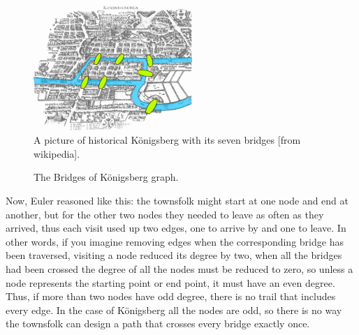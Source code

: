 \documentclass[11pt,a4paper]{scrartcl}
\begin{document}
  

\begin{figure}
\begin{center}
\includegraphics[width=6cm]{Konigsberg_bridges.png}
\end{center}
\caption{A picture of historical K\"{o}nigsberg with its seven bridges [from wikipedia].\label{fig:konigsberg}}
\end{figure}



\begin{figure}
\begin{center}
\end{center}
\caption{The Bridges of K\"{o}nigsberg graph. \label{fig:konigsberg_graph}}
\end{figure}

Now, Euler reasoned like this: the townsfolk might start at one node
and end at another, but for the other two nodes they needed to leave
as often as they arrived, thus each visit used up two edges, one to
arrive by and one to leave. In other words, if you imagine removing
edges when the corresponding bridge has been traversed, visiting a
node reduced its degree by two, when all the bridges had been crossed
the degree of all the nodes must be reduced to zero, so unless a node
represents the starting point or end point, it must have an even
degree. Thus, if more than two nodes have odd degree, there is no
trail that includes every edge. In the case of K\"{o}nigsberg all the
nodes are odd, so there is no way the townsfolk can design a path that
crosses every bridge exactly once.
\end{document}
